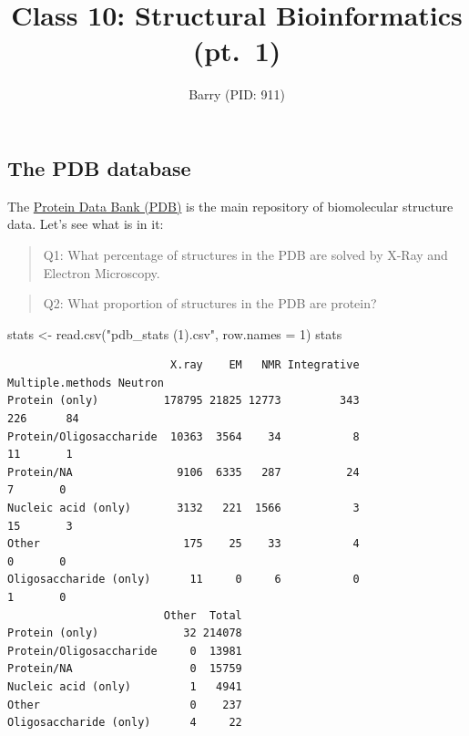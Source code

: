 \documentclass[
  letterpaper,
  DIV=11,
  numbers=noendperiod]{scrartcl}
\title{Class 10: Structural Bioinformatics (pt.~1)}
\author{Barry (PID: 911)}
\date{}
\newenvironment{Shaded}{\begin{snugshade}}{\end{snugshade}}
\newcommand{\AttributeTok}[1]{\textcolor[rgb]{0.40,0.45,0.13}{#1}}
\newcommand{\DecValTok}[1]{\textcolor[rgb]{0.68,0.00,0.00}{#1}}
\newcommand{\FunctionTok}[1]{\textcolor[rgb]{0.28,0.35,0.67}{#1}}
\newcommand{\NormalTok}[1]{\textcolor[rgb]{0.00,0.23,0.31}{#1}}
\newcommand{\OtherTok}[1]{\textcolor[rgb]{0.00,0.23,0.31}{#1}}
\newcommand{\StringTok}[1]{\textcolor[rgb]{0.13,0.47,0.30}{#1}}
\renewcommand*\contentsname{Table of contents}
\newcommand\contentsname{Table of contents}
\begin{document}
\maketitle

\renewcommand*\contentsname{Table of contents}
{
\hypersetup{linkcolor=}
\setcounter{tocdepth}{3}
\tableofcontents
}

\subsection{The PDB database}\label{the-pdb-database}

The \href{http://www.rcsb.org/}{Protein Data Bank (PDB)} is the main
repository of biomolecular structure data. Let's see what is in it:

\begin{quote}
Q1: What percentage of structures in the PDB are solved by X-Ray and
Electron Microscopy.
\end{quote}

\begin{quote}
Q2: What proportion of structures in the PDB are protein?
\end{quote}

\begin{Shaded}
\begin{Highlighting}[]
\NormalTok{stats }\OtherTok{\textless{}{-}} \FunctionTok{read.csv}\NormalTok{(}\StringTok{"pdb\_stats (1).csv"}\NormalTok{, }\AttributeTok{row.names =} \DecValTok{1}\NormalTok{)}
\NormalTok{stats}
\end{Highlighting}
\end{Shaded}

\begin{verbatim}
                         X.ray    EM   NMR Integrative Multiple.methods Neutron
Protein (only)          178795 21825 12773         343              226      84
Protein/Oligosaccharide  10363  3564    34           8               11       1
Protein/NA                9106  6335   287          24                7       0
Nucleic acid (only)       3132   221  1566           3               15       3
Other                      175    25    33           4                0       0
Oligosaccharide (only)      11     0     6           0                1       0
                        Other  Total
Protein (only)             32 214078
Protein/Oligosaccharide     0  13981
Protein/NA                  0  15759
Nucleic acid (only)         1   4941
Other                       0    237
Oligosaccharide (only)      4     22
\end{verbatim}
\end{document}
